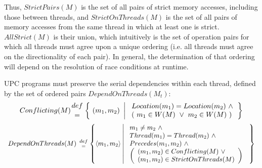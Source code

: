 \documentclass[12pt,titlepage]{article}
\newcounter{parnum}
\newcommand\np{\addtocounter{parnum}{1}\hspace{-2em}\makebox[2em][l]{\arabic{parnum}}}
\begin{document}
\np Thus, $StrictPairs(M)$ is the set of all pairs of strict memory 
accesses, including those between threads, and $StrictOnThreads(M)$ is
the set of all pairs of memory accesses from the same thread in which at least 
one is strict.  $AllStrict(M)$ is their union, which intuitively is the set of
operation pairs for which all threads must agree upon a unique ordering
(i.e. all threads must agree on the directionality of each pair).
In general, the determination of that ordering will depend on the resolution of 
race conditions at runtime.  

\np UPC programs must preserve the serial dependencies within each thread, 
defined by the set of ordered pairs $DependOnThreads(M_t)$:
\[
Conflicting(M) {def \atop =} \left\{\ (m_1, m_2)\ \left|\ 
\begin{array}{lc} Location(m_1) = Location(m_2)\ \land \\
             (\ m_1 \in W(M)\ \lor\ m_2 \in W(M)\ ) \end{array} \right. \right\} 
\]
\[
\begin{array}{l}
DependOnThreads(M)\ {def \atop =}
\left\{ \langle m_1, m_2\rangle  \left|\ \begin{array}{l} 
 m_1 \neq m_2\ \land\ \\ Thread(m_1) = Thread(m_2)\ \land \\ 
 Precedes(m_1, m_2)\ \land \\
 \left( \begin{array}{l} (m_1, m_2) \in Conflicting(M)\ \lor \\ 
                         (m_1,m_2) \in StrictOnThreads(M) \end{array}\right)\ \end{array} \right. \right\} 
\end{array}
\]
\end{document}
